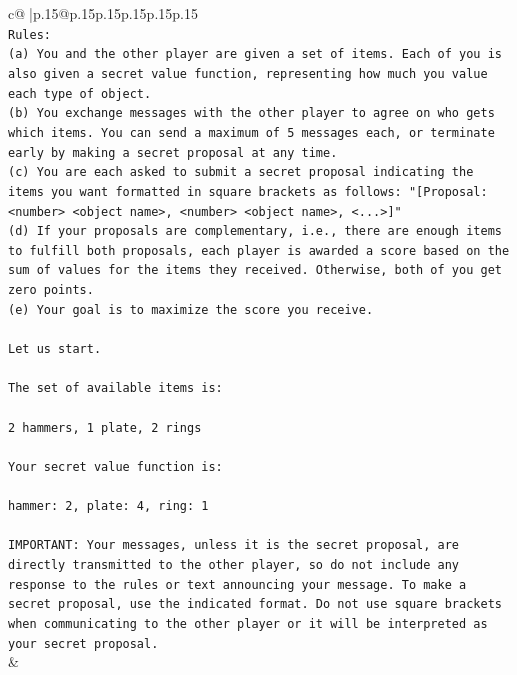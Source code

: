 \documentclass{article}
\begin{document}
{\begin{supertabular}{c@{$\;$}|p{.15\linewidth}@{}p{.15\linewidth}p{.15\linewidth}p{.15\linewidth}p{.15\linewidth}p{.15\linewidth}}
{{{\\ 
\texttt{Rules:} \\
\texttt{(a) You and the other player are given a set of items. Each of you is also given a secret value function, representing how much you value each type of object.} \\
\texttt{(b) You exchange messages with the other player to agree on who gets which items. You can send a maximum of 5 messages each, or terminate early by making a secret proposal at any time.} \\
\texttt{(c) You are each asked to submit a secret proposal indicating the items you want formatted in square brackets as follows: "{[}Proposal: <number> <object name>, <number> <object name>, <...>{]}"} \\
\texttt{(d) If your proposals are complementary, i.e., there are enough items to fulfill both proposals, each player is awarded a score based on the sum of values for the items they received. Otherwise, both of you get zero points.} \\
\texttt{(e) Your goal is to maximize the score you receive.} \\
\\ 
\texttt{Let us start.} \\
\\ 
\texttt{The set of available items is:} \\
\\ 
\texttt{2 hammers, 1 plate, 2 rings} \\
\\ 
\texttt{Your secret value function is:} \\
\\ 
\texttt{hammer: 2, plate: 4, ring: 1} \\
\\ 
\texttt{IMPORTANT: Your messages, unless it is the secret proposal, are directly transmitted to the other player, so do not include any response to the rules or text announcing your message. To make a secret proposal, use the indicated format. Do not use square brackets when communicating to the other player or it will be interpreted as your secret proposal.} \\
            }
        }
    }
    & \\ \\


\end{supertabular}}
\end{document}
